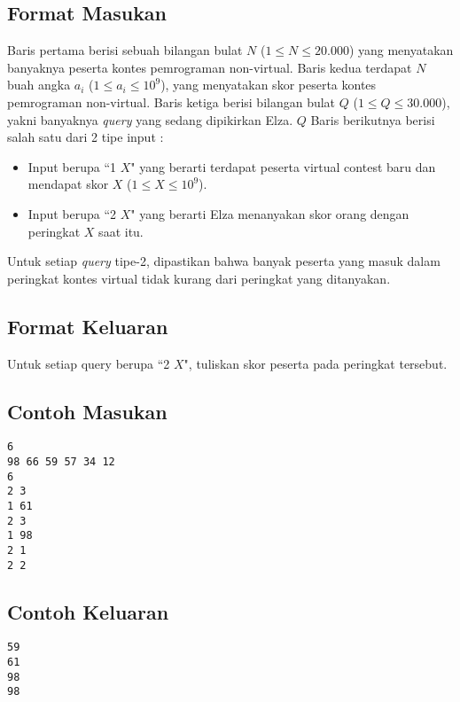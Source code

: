 \documentclass{article}
\begin{document}
\subsection*{Format Masukan}
Baris pertama berisi sebuah bilangan bulat $N$ ($1 \leq N \leq 20.000$) yang menyatakan banyaknya peserta kontes pemrograman non-virtual.
Baris kedua terdapat $N$ buah angka $a_i$ ($1 \leq a_i \leq 10^9$), yang menyatakan skor peserta kontes pemrograman non-virtual. Baris ketiga berisi bilangan bulat $Q$ ($1 \leq Q \leq 30.000$), yakni banyaknya \textit{query} yang sedang dipikirkan Elza.
$Q$ Baris berikutnya berisi salah satu dari 2 tipe input :
\begin{itemize}
    \setlength{\itemsep}{0pt}
    \item Input berupa ``1 $X$" yang berarti terdapat peserta virtual contest baru dan mendapat skor $X$ ($1 \leq X \leq 10^9$).
    \item Input berupa ``2 $X$" yang berarti Elza menanyakan skor orang dengan peringkat $X$ saat itu.
\end{itemize}
Untuk setiap \textit{query} tipe-2, dipastikan bahwa banyak peserta yang masuk dalam peringkat kontes virtual tidak kurang dari peringkat yang ditanyakan.

\subsection*{Format Keluaran}

Untuk setiap query berupa ``2 $X$", tuliskan skor peserta pada peringkat tersebut.
\\

\begin{multicols}{2}
\subsection*{Contoh Masukan}
\begin{lstlisting}
6
98 66 59 57 34 12
6
2 3
1 61
2 3
1 98
2 1
2 2
\end{lstlisting}
\columnbreak
\subsection*{Contoh Keluaran}
\begin{lstlisting}
59
61
98
98
\end{lstlisting}
\vfill
\null
\end{multicols}


\pagebreak
\end{document}
